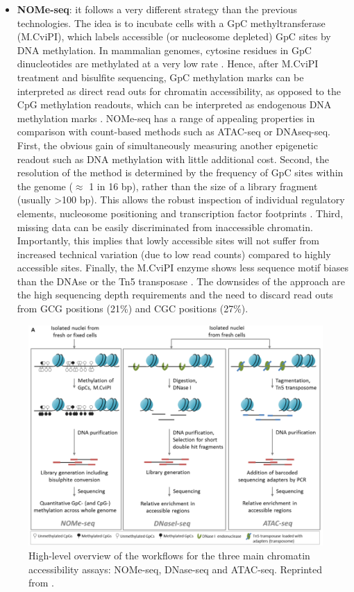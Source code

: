 \begin{itemize}
	\item \textbf{NOMe-seq}: it follows a very different strategy than the previous technologies. The idea is to incubate cells with a GpC methyltransferase (M.CviPI), which labels accessible (or nucleosome depleted) GpC sites by DNA methylation. In mammalian genomes, cytosine residues in GpC dinucleotides are methylated at a very low rate \cite{Kilgore2007}. Hence, after M.CviPI treatment and bisulfite sequencing, GpC methylation marks can be interpreted as direct read outs for chromatin accessibility, as opposed to the CpG methylation readouts, which can be interpreted as endogenous DNA methylation marks \cite{Kelly2012}.
	NOMe-seq has a range of appealing properties in comparison with count-based methods such as ATAC-seq or DNAseq-seq. First, the obvious gain of simultaneously measuring another epigenetic readout such as DNA methylation with little additional cost. Second, the resolution of the method is determined by the frequency of GpC sites within the genome ($\approx$ 1 in 16 bp), rather than the size of a library fragment (usually >100 bp). This allows the robust inspection of individual regulatory elements, nucleosome positioning and transcription factor footprints \cite{Kelly2012,Pott2016,Nordstrom2019}. Third, missing data can be easily discriminated from inaccessible chromatin. Importantly, this implies that lowly accessible sites will not suffer from increased technical variation (due to low read counts) compared to highly accessible sites. Finally, the M.CviPI enzyme shows less sequence motif biases than the DNAse or the Tn5 transposase \cite{Nordstrom2019}.
	The downsides of the approach are the high sequencing depth requirements and the need to discard read outs from GCG positions (21\%) and CGC positions (27\%).	

\end{itemize}



\begin{figure}[H]
	\centering
	\includegraphics[width=0.8\linewidth]{ChromatinAcc_protocols}
	\caption[]{High-level overview of the workflows for the three main chromatin accessibility assays: NOMe-seq, DNase-seq and ATAC-seq. Reprinted from \cite{Nordstrom2019}. }
	\label{fig:ChromatinAcc_protocols}
\end{figure}

